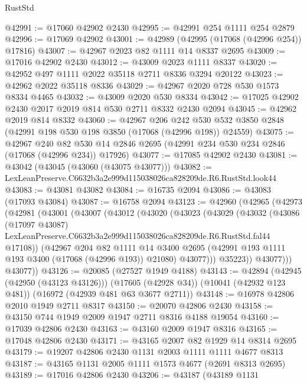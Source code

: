 \begin{lexlean}{RustStd}
\begin{coremodule}
@42991 := @17060 @42902 @2430
@42995 := @42991 @254 @1111 @254 @2879
@42996 := @17069 @42902
@43001 := @42989 (@42995 (@17068 (@42996 @254)) @17816)
@43007 := @42967 @2023 @82 @1111 @14 @8337 @2695
@43009 := @17016 @42902 @2430
@43012 := @43009 @2023 @1111 @8337
@43020 := @42952 @497 @1111 @2022 @35118 @2711 @8336 @3294 @20122
@43023 := @42962 @2022 @35118 @8336
@43029 := @42967 @2020 @728 @530 @1573 @8334 @4465
@43032 := @43009 @2020 @530 @8334
@43042 := @17025 @42902 @2430 @2017 @2019 @814 @530 @2711 @8332 @2430 @2094
@43045 := @42962 @2019 @814 @8332
@43060 := @42967
    @206
    @242
    @530
    @532
    @3850
    @2848
    (@42991 @198 @530 @198 @3850 (@17068 (@42996 @198)) @24559)
@43075 := @42967
    @240
    @82
    @530
    @14
    @2846
    @2695
    (@42991 @234 @530 @234 @2846 (@17068 (@42996 @234)) @17926)
@43077 := @17085 @42902 @2430
@43081 := @43042 (@43045 (@43060 (@43075 @43077)))
@43082 := LexLeanPreserve.C6632b3a2e999d115038026ca828209de.R6.RustStd.look44
@43083 := @43081 @43082
@43084 := @16735 @2094
@43086 := @43083 (@17093 @43084)
@43087 := @16758 @2094
@43123 := @42960
    (@42965
      (@42973
        (@42981
          (@43001
            (@43007
              (@43012
                (@43020
                  (@43023
                    (@43029
                      (@43032
                        (@43086
                          (@17097 @43087)
                          LexLeanPreserve.C6632b3a2e999d115038026ca828209de.R6.RustStd.fal44
                          @17108))
                      (@42967
                        @204
                        @82
                        @1111
                        @14
                        @3400
                        @2695
                        (@42991 @193 @1111 @193 @3400 (@17068 (@42996 @193)) @21080)
                        @43077)))
                  @35223))
              @43077)))
        @43077))
@43126 := @20085 (@27527 @1949 @4188)
@43143 := @42894
    (@42945 (@42950 (@43123 @43126)))
    (@17605 (@42928 @34))
    (@10041 (@42932 @123 @481))
    (@16972 (@42939 @481 @63 @3677 @2711))
@43148 := @16978 @42806 @2010 @1949 @2711 @8317
@43150 := @20070 @42806 @2430
@43158 := @43150 @744 @1949 @2009 @1947 @2711 @8316 @4188 @19054
@43160 := @17039 @42806 @2430
@43163 := @43160 @2009 @1947 @8316
@43165 := @17048 @42806 @2430
@43171 := @43165 @2007 @82 @1929 @14 @8314 @2695
@43179 := @19207 @42806 @2430 @1131 @2003 @1111 @1111 @4677 @8313
@43187 := @43165 @1131 @2005 @1111 @1573 @4677 (@2691 @8313 @2695)
@43189 := @17016 @42806 @2430
@43206 := @43187
    (@43189
      @1131

\end{coremodule}
\end{lexlean}
